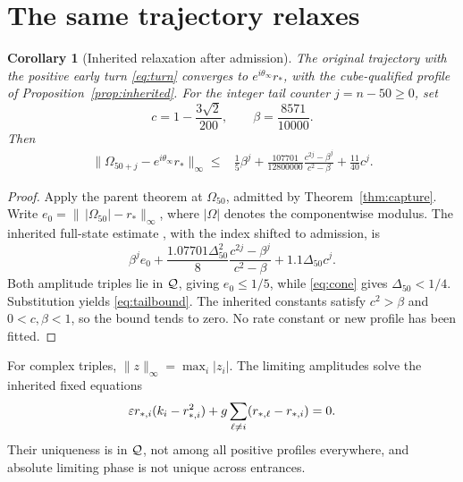 \documentclass[11pt,a4paper]{article}
\numberwithin{equation}{section}
\newtheorem{corollary}[theorem]{Corollary}
\theoremstyle{remark}\newtheorem{remark}[theorem]{Remark}
\begin{document}
\section{The same trajectory relaxes}\label{sec:tail}
\begin{corollary}[Inherited relaxation after admission]\label{cor:relaxation}
The original trajectory with the positive early turn \eqref{eq:turn} converges to $e^{i\theta_\infty}r_*$, with the cube-qualified profile of Proposition~\ref{prop:inherited}. For the integer tail counter $j=n-50\ge0$, set
\begin{equation}
c=1-\frac{3\sqrt2}{200},\qquad\beta=\frac{8571}{10000}.
\label{eq:constants}
\end{equation}
Then
\begin{equation}
\begin{split}
\|\Omega_{50+j}-e^{i\theta_\infty}r_*\|_\infty
\le{}&\frac15\beta^j+
\frac{107701}{12800000}\frac{c^{2j}-\beta^j}{c^2-\beta}
+\frac{11}{40}c^j.
\end{split}\label{eq:tailbound}
\end{equation}
\end{corollary}
\begin{proof}
Apply the parent theorem at $\Omega_{50}$, admitted by Theorem~\ref{thm:capture}. Write $e_0=\|\,|\Omega_{50}|-r_*\|_\infty$, where $|\Omega|$ denotes the componentwise modulus. The inherited full-state estimate \cite[\texttt{eq:fullbound}]{parent}, with the index shifted to admission, is
\begin{equation}
\beta^j e_0+
\frac{1.07701\Delta_{50}^2}{8}\frac{c^{2j}-\beta^j}{c^2-\beta}
+1.1\Delta_{50}c^j.\label{eq:inheritedbound}
\end{equation}
Both amplitude triples lie in $\mathcal Q$, giving $e_0\le1/5$, while \eqref{eq:cone} gives $\Delta_{50}<1/4$. Substitution yields \eqref{eq:tailbound}. The inherited constants satisfy $c^2>\beta$ and $0<c,\beta<1$, so the bound tends to zero. No rate constant or new profile has been fitted.
\end{proof}
For complex triples, $\|z\|_\infty=\max_i|z_i|$. The limiting amplitudes solve the inherited fixed equations
\begin{equation}
\varepsilon r_{*,i}(k_i-r_{*,i}^2)+g\sum_{\ell\ne i}(r_{*,\ell}-r_{*,i})=0.
\label{eq:fixed}
\end{equation}
Their uniqueness is in $\mathcal Q$, not among all positive profiles everywhere, and absolute limiting phase is not unique across entrances.
\end{document}
